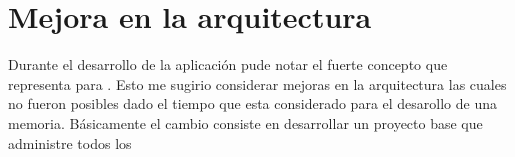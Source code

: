
\section{Mejora en la arquitectura}
Durante el desarrollo de la aplicación pude notar el fuerte concepto que representa \packageAS para \meteorNAME. Esto me sugirio considerar mejoras en la arquitectura las cuales no fueron posibles dado el tiempo que esta considerado para el desarollo de una memoria.
Básicamente el cambio consiste en desarrollar un proyecto base que administre todos los \packageAS
